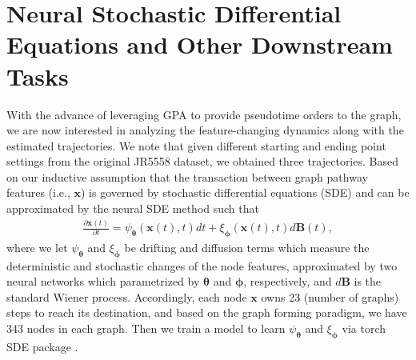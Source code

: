 \documentclass{article} %
\begin{document}
\section{Neural Stochastic Differential Equations and Other Downstream Tasks}\label{sec:nsde}
With the advance of leveraging GPA to provide pseudotime orders to the graph, we are now interested in analyzing the feature-changing dynamics along with the estimated trajectories. We note that given different starting and ending point settings from the original JR5558 dataset, we obtained three trajectories. Based on our inductive assumption that the transaction between graph pathway features (i.e., $\mathbf x$) is governed by stochastic differential equations (SDE) and can be approximated by the neural SDE method such that
\begin{align}\label{eq:sde}
    \frac{\partial \mathbf x(t)}{\partial t} = \psi_{\boldsymbol{\theta}} (\mathbf x(t), t) dt + \xi_{\boldsymbol{\phi}}(\mathbf x(t), t)d\mathbf B(t), 
\end{align}
where we let $\psi_{\boldsymbol{\theta}}$ and $ \xi_{\boldsymbol{\phi}}$ be drifting and diffusion terms which measure the deterministic and stochastic changes of the node features, approximated by two neural networks which parametrized by $\boldsymbol{\theta}$ and $\boldsymbol{\phi}$, respectively, and $d\mathbf B$ is the standard Wiener process. Accordingly, each node $\mathbf x$ owns 23 (number of graphs) steps to reach its destination, and based on the graph forming paradigm, we have 343 nodes in each graph.  Then we train a model to learn $\psi_{\boldsymbol{\theta}}$ and $ \xi_{\boldsymbol{\phi}}$ via torch SDE package \citep{li2020scalable}. 
\end{document}
